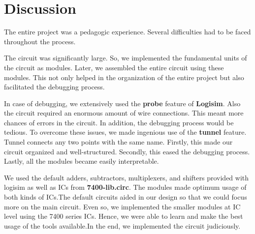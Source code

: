 \documentclass[18pt]{article}
\begin{document}
\normalsize

\section{Discussion}
\Large
\justifying
The entire project was a pedagogic experience. Several difficulties had to be faced throughout the process.\par 
\vspace{5mm}
The circuit was significantly large. So, we implemented the fundamental units 
of the circuit as modules. Later, we assembled the entire circuit using these modules. This not only helped in the organization of the entire project but also facilitated the debugging process.
\par
\vspace{5mm}
In case of debugging, we extensively used the \textbf{probe} feature of \textbf{Logisim}. Also the circuit required an enormous amount of wire connections. This meant more chances of errors in the circuit. In addition, the debugging process would be tedious. To overcome these issues, we made ingenious use of the \textbf{tunnel} feature. Tunnel connects any two points with the same name. Firstly, this made our circuit organized and well-structured. Secondly, this eased the debugging process. Lastly, all the modules became easily interpretable.\par
\vspace{5mm}
We used the default adders, subtractors, multiplexers, and shifters provided with logisim as well as ICs from \textbf{7400-lib.circ}. The modules made optimum usage of both kinds of ICs.The default circuits aided in our design so that we could focus more on the main circuit. Even so, we implemented the smaller modules at IC level using the 7400 series ICs. Hence, we were able to learn and make the best usage of the tools available.In the end, we implemented the circuit judiciously.
\end{document}
